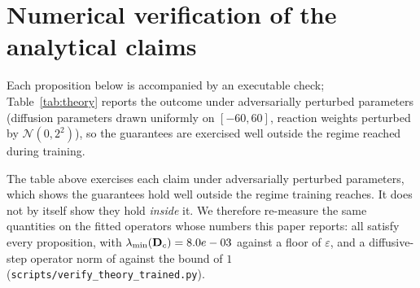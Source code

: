 \section{Numerical verification of the analytical claims}
\label{app:verification}

Each proposition below is accompanied by an executable check; Table~\ref{tab:theory} reports the outcome under adversarially perturbed parameters (diffusion parameters drawn uniformly on $[-60,60]$, reaction weights perturbed by $\mathcal{N}(0,2^2)$), so the guarantees are exercised well outside the regime reached during training.

The table above exercises each claim under adversarially perturbed parameters,
which shows the guarantees hold well outside the regime training reaches. It
does not by itself show they hold \emph{inside} it. We therefore re-measure the
same quantities on the \TheoryTrainedN{} fitted operators whose numbers this
paper reports: all \TheoryTrainedOK{} satisfy every proposition, with
$\lambda_{\min}(\mathbf{D}_c) = 8.0e-03$ against a floor of
$\varepsilon$, and a diffusive-step operator norm of \TheoryTrainedSup{} against
the bound of $1$ (\texttt{scripts/verify\_theory\_trained.py}).
